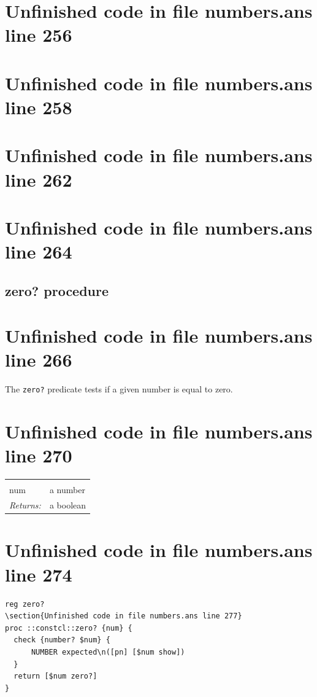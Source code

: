 \documentclass[twoside,9pt]{report}
\begin{document}
\section{Unfinished code in file numbers.ans line 256}
\section{Unfinished code in file numbers.ans line 258}
\section{Unfinished code in file numbers.ans line 262}
\section{Unfinished code in file numbers.ans line 264}
\subsection{zero? procedure}
\label{zero?-procedure}
\section{Unfinished code in file numbers.ans line 266}


The \texttt{zero?} predicate tests if a given number is equal to zero.

\section{Unfinished code in file numbers.ans line 270}
\noindent\begin{tabular}{ |p{1.9cm} p{8cm}| }
\hline
\rowcolor[HTML]{CCCCCC} \multicolumn{2}{|l|}{\bf zero? (public)} \\
num & a number \\
\textit{Returns:} & a boolean \\
\hline
\end{tabular}
\section{Unfinished code in file numbers.ans line 274}
\begin{lstlisting}
reg zero?
\section{Unfinished code in file numbers.ans line 277}
proc ::constcl::zero? {num} {
  check {number? $num} {
      NUMBER expected\n([pn] [$num show])
  }
  return [$num zero?]
}
\end{lstlisting}
\end{document}
